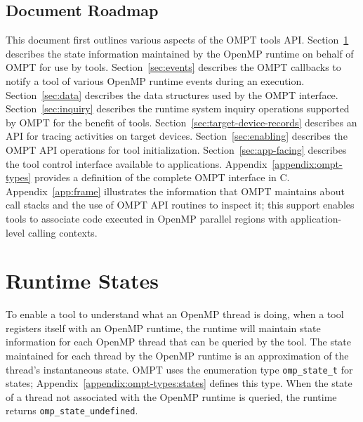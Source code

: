 \documentclass{article}
\begin{document}
\subsection{Document Roadmap}
This document first outlines various aspects of the OMPT tools API. 
Section~\ref{sec:states} describes the state information maintained by the OpenMP runtime on behalf of OMPT for use by tools.
Section~\ref{sec:events} describes the OMPT callbacks to notify a tool of various OpenMP runtime events during an execution.
Section~\ref{sec:data} describes the data structures used by the OMPT interface.
Section~\ref{sec:inquiry} describes the runtime system inquiry operations supported by OMPT for the benefit of tools.
Section~\ref{sec:target-device-records} describes an API for tracing activities on target devices.
Section~\ref{sec:enabling} describes the OMPT API operations for tool initialization.
Section~\ref{sec:app-facing} describes the tool control interface available to applications.
Appendix~\ref{appendix:ompt-types} provides a definition of the complete OMPT interface in C.
Appendix~\ref{app:frame} illustrates the information that OMPT maintains about call stacks and the use of OMPT API routines to inspect it; this support enables tools to associate code executed in OpenMP parallel regions with  application-level calling contexts. 

\section{Runtime States} 
\label{sec:states} 

To enable a tool to understand what an OpenMP thread is doing, when a tool registers itself with an OpenMP runtime, the runtime 
will maintain state information for each OpenMP thread that can be queried by the tool. 
The state maintained for each thread by the OpenMP runtime is an
approximation of the thread's instantaneous state. 
OMPT uses the enumeration type \lstinline|omp_state_t| for states;
Appendix~\ref{appendix:ompt-types:states} defines this type.
When the state of a thread not associated with the OpenMP runtime is queried, the runtime returns 
\lstinline|omp_state_undefined|.

\end{document}
